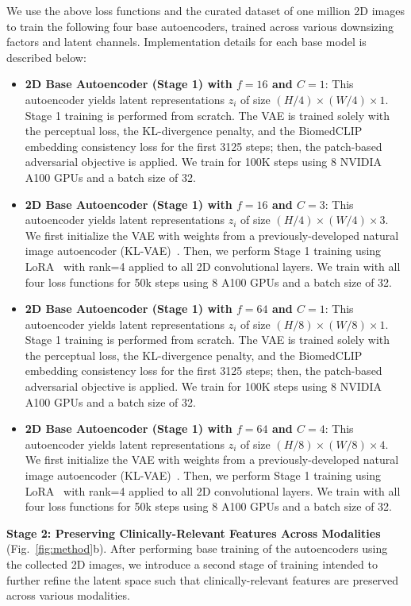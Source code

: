 We use the above loss functions and the curated dataset of one million 2D images to train the following four base autoencoders, trained across various downsizing factors and latent channels. Implementation details for each base model is described below:
\begin{itemize}
\item \textbf{2D Base Autoencoder (Stage 1) with $f=16$ and $C=1$}: This autoencoder yields latent representations $z_i$ of size $(H/4) \times (W/4) \times 1$. Stage 1 training is performed from scratch. The VAE is trained solely with the perceptual loss, the KL-divergence penalty, and the BiomedCLIP embedding consistency loss for the first 3125 steps; then, the patch-based adversarial objective is applied. We train for 100K steps using 8 NVIDIA A100 GPUs and a batch size of 32. 
\item \textbf{2D Base Autoencoder (Stage 1)  with $f=16$ and $C=3$}: This autoencoder yields latent representations $z_i$ of size $(H/4) \times (W/4) \times 3$. We first initialize the VAE with weights from a previously-developed natural image autoencoder (KL-VAE)~\cite{rombach2022high}. Then, we perform Stage 1 training using LoRA~\cite{hu2021lora} with rank=4 applied to all 2D convolutional layers. We train with all four loss functions for 50k steps using 8 A100 GPUs and a batch size of 32. 
\item \textbf{2D Base Autoencoder (Stage 1)  with $f=64$ and $C=1$}: This autoencoder yields latent representations $z_i$ of size $(H/8) \times (W/8) \times 1$. Stage 1 training is performed from scratch. The VAE is trained solely with the perceptual loss, the KL-divergence penalty, and the BiomedCLIP embedding consistency loss for the first 3125 steps; then, the patch-based adversarial objective is applied. We train for 100K steps using 8 NVIDIA A100 GPUs and a batch size of 32. 
\item \textbf{2D Base Autoencoder (Stage 1)  with $f=64$ and $C=4$}: This autoencoder yields latent representations $z_i$ of size $(H/8) \times (W/8) \times 4$. We first initialize the VAE with weights from a previously-developed natural image autoencoder (KL-VAE)~\cite{rombach2022high}. Then, we perform Stage 1 training using LoRA~\cite{hu2021lora} with rank=4 applied to all 2D convolutional layers. We train with all four loss functions for 50k steps using 8 A100 GPUs and a batch size of 32. 
\end{itemize}
 

\textbf{Stage 2: Preserving Clinically-Relevant Features Across Modalities} (Fig.~\ref{fig:method}b). After performing base training of the autoencoders using the collected 2D images, we introduce a second stage of training intended to further refine the latent space such that clinically-relevant features are preserved across various modalities. 

